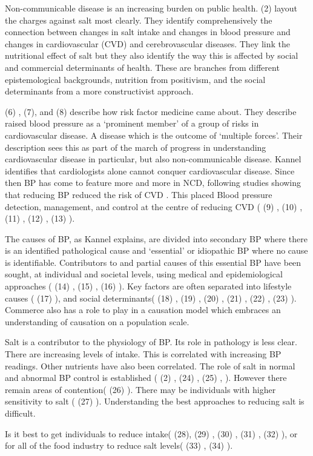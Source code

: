 \documentclass[
]{article}
\begin{document}
Non-communicable disease is an increasing burden on public health. (2)
layout the charges against salt most clearly. They identify
comprehensively the connection between changes in salt intake and
changes in blood pressure and changes in cardiovascular (CVD) and
cerebrovascular diseases. They link the nutritional effect of salt but
they also identify the way this is affected by social and commercial
determinants of health. These are branches from different
epistemological backgrounds, nutrition from positivism, and the social
determinants from a more constructivist approach.

(6) , (7), and (8) describe how risk factor medicine came about. They
describe raised blood pressure as a `prominent member' of a group of
risks in cardiovascular disease. A disease which is the outcome of
`multiple forces'. Their description sees this as part of the march of
progress in understanding cardiovascular disease in particular, but also
non-communicable disease. Kannel identifies that cardiologists alone
cannot conquer cardiovascular disease. Since then BP has come to feature
more and more in NCD, following studies showing that reducing BP reduced
the risk of CVD . This placed Blood pressure detection, management, and
control at the centre of reducing CVD ( (9) , (10) , (11) , (12) , (13)
).

The causes of BP, as Kannel explains, are divided into secondary BP
where there is an identified pathological cause and `essential' or
idiopathic BP where no cause is identifiable. Contributors to and
partial causes of this essential BP have been sought, at individual and
societal levels, using medical and epidemiological approaches ( (14) ,
(15) , (16) ). Key factors are often separated into lifestyle causes (
(17) ), and social determinants( (18) , (19) , (20) , (21) , (22) , (23)
). Commerce also has a role to play in a causation model which embraces
an understanding of causation on a population scale.

Salt is a contributor to the physiology of BP. Its role in pathology is
less clear. There are increasing levels of intake. This is correlated
with increasing BP readings. Other nutrients have also been correlated.
The role of salt in normal and abnormal BP control is established ( (2)
, (24) , (25) , ). However there remain areas of contention( (26) ).
There may be individuals with higher sensitivity to salt ( (27) ).
Understanding the best approaches to reducing salt is difficult.

Is it best to get individuals to reduce intake( (28), (29) , (30) , (31)
, (32) ), or for all of the food industry to reduce salt levels( (33) ,
(34) ).
\end{document}
